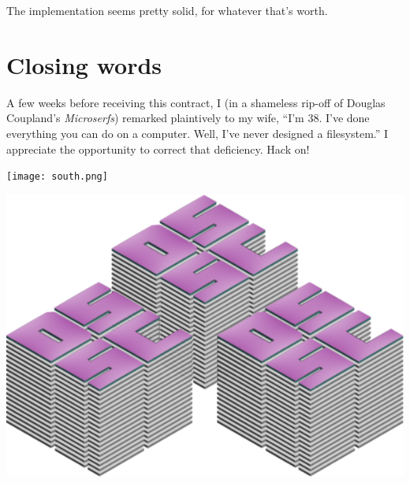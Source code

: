 \documentclass[letterpaper,10pt]{article}
\begin{document}
The implementation seems pretty solid, for whatever that's worth.

\section{Closing words}
A few weeks before receiving this contract, I (in a shameless rip-off of Douglas
Coupland's \textit{Microserfs}\parencite{microserfs}) remarked plaintively to
my wife, ``I'm 38. I've done everything you can do on a computer. Well, I've
never designed a filesystem.'' I appreciate the opportunity to correct that
deficiency. Hack on!
\vspace{1cm}

\begin{minipage}{\textwidth}
\begin{center}
\texttt{[image: south.png]}
\end{center}
\end{minipage}
\vspace{1cm}

\printbibliography

\begin{minipage}{\textwidth}
\begin{center}
\includegraphics[width=.4\linewidth]{../dsscaw-purp-scaled.png}
\end{center}
\end{minipage}
\end{document}
